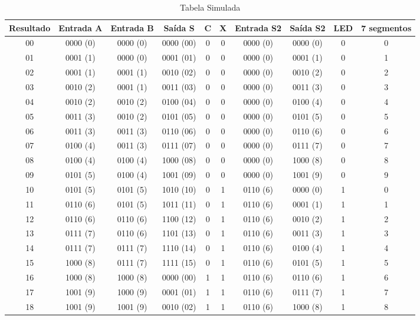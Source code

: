\documentclass[11pt]{report}         %
\begin{document}
\begin{table}[h!]
    \begingroup
    \footnotesize
    \caption{Tabela Simulada}

        \begin{tabular}{|>{\columncolor{black}\color{white}}c|c|c|c|c|c|c|c|c|c|}

      \hline
      \textbf{Resultado} & \textbf{Entrada A} & \textbf{Entrada B} & \textbf{Saída S} & \textbf{C} & \textbf{X} & \textbf{Entrada S2} & \textbf{Saída S2} & \textbf{LED} & \textbf{7 segmentos}\\ \hline
      00 & 0000 (0) & 0000 (0) & 0000 (00) & 0 & 0 & 0000 (0) & 0000 (0) & 0 & 0 \\ \hline
      01 & 0001 (1) & 0000 (0) & 0001 (01) & 0 & 0 & 0000 (0) & 0001 (1) & 0 & 1 \\ \hline
      02 & 0001 (1) & 0001 (1) & 0010 (02) & 0 & 0 & 0000 (0) & 0010 (2) & 0 & 2 \\ \hline
      03 & 0010 (2) & 0001 (1) & 0011 (03) & 0 & 0 & 0000 (0) & 0011 (3) & 0 & 3 \\ \hline
      04 & 0010 (2) & 0010 (2) & 0100 (04) & 0 & 0 & 0000 (0) & 0100 (4) & 0 & 4 \\ \hline
      05 & 0011 (3) & 0010 (2) & 0101 (05) & 0 & 0 & 0000 (0) & 0101 (5) & 0 & 5 \\ \hline
      06 & 0011 (3) & 0011 (3) & 0110 (06) & 0 & 0 & 0000 (0) & 0110 (6) & 0 & 6 \\ \hline
      07 & 0100 (4) & 0011 (3) & 0111 (07) & 0 & 0 & 0000 (0) & 0111 (7) & 0 & 7 \\ \hline
      08 & 0100 (4) & 0100 (4) & 1000 (08) & 0 & 0 & 0000 (0) & 1000 (8) & 0 & 8 \\ \hline
      09 & 0101 (5) & 0100 (4) & 1001 (09) & 0 & 0 & 0000 (0) & 1001 (9) & 0 & 9 \\ \hline
      10 & 0101 (5) & 0101 (5) & 1010 (10) & 0 & 1 & 0110 (6) & 0000 (0) & 1 & 0 \\ \hline
      11 & 0110 (6) & 0101 (5) & 1011 (11) & 0 & 1 & 0110 (6) & 0001 (1) & 1 & 1 \\ \hline
      12 & 0110 (6) & 0110 (6) & 1100 (12) & 0 & 1 & 0110 (6) & 0010 (2) & 1 & 2 \\ \hline
      13 & 0111 (7) & 0110 (6) & 1101 (13) & 0 & 1 & 0110 (6) & 0011 (3) & 1 & 3 \\ \hline
      14 & 0111 (7) & 0111 (7) & 1110 (14) & 0 & 1 & 0110 (6) & 0100 (4) & 1 & 4 \\ \hline
      15 & 1000 (8) & 0111 (7) & 1111 (15) & 0 & 1 & 0110 (6) & 0101 (5) & 1 & 5 \\ \hline
      16 & 1000 (8) & 1000 (8) & 0000 (00) & 1 & 1 & 0110 (6) & 0110 (6) & 1 & 6 \\ \hline
      17 & 1001 (9) & 1000 (9) & 0001 (01) & 1 & 1 & 0110 (6) & 0111 (7) & 1 & 7 \\ \hline
      18 & 1001 (9) & 1001 (9) & 0010 (02) & 1 & 1 & 0110 (6) & 1000 (8) & 1 & 8 \\ \hline

    \end{tabular}
    \endgroup
\end{table}
\end{document}

